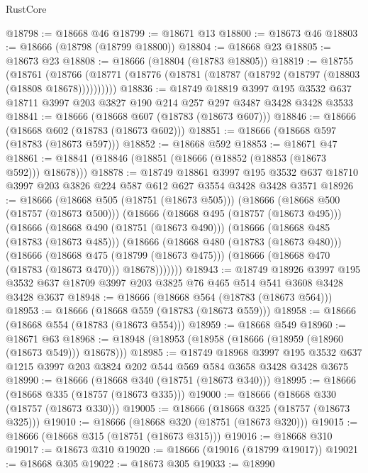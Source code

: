 \begin{lexlean}{RustCore}
\begin{coremodule}
@18798 := @18668 @46
@18799 := @18671 @13
@18800 := @18673 @46
@18803 := @18666 (@18798 (@18799 @18800))
@18804 := @18668 @23
@18805 := @18673 @23
@18808 := @18666 (@18804 (@18783 @18805))
@18819 := @18755
    (@18761 (@18766 (@18771 (@18776 (@18781 (@18787 (@18792 (@18797 (@18803 (@18808 @18678))))))))))
@18836 := @18749
    @18819
    @3997
    @195
    @3532
    @637
    @18711
    @3997
    @203
    @3827
    @190
    @214
    @257
    @297
    @3487
    @3428
    @3428
    @3533
@18841 := @18666 (@18668 @607 (@18783 (@18673 @607)))
@18846 := @18666 (@18668 @602 (@18783 (@18673 @602)))
@18851 := @18666 (@18668 @597 (@18783 (@18673 @597)))
@18852 := @18668 @592
@18853 := @18671 @47
@18861 := @18841 (@18846 (@18851 (@18666 (@18852 (@18853 (@18673 @592))) @18678)))
@18878 := @18749
    @18861
    @3997
    @195
    @3532
    @637
    @18710
    @3997
    @203
    @3826
    @224
    @587
    @612
    @627
    @3554
    @3428
    @3428
    @3571
@18926 := @18666
    (@18668 @505 (@18751 (@18673 @505)))
    (@18666
      (@18668 @500 (@18757 (@18673 @500)))
      (@18666
        (@18668 @495 (@18757 (@18673 @495)))
        (@18666
          (@18668 @490 (@18751 (@18673 @490)))
          (@18666
            (@18668 @485 (@18783 (@18673 @485)))
            (@18666
              (@18668 @480 (@18783 (@18673 @480)))
              (@18666
                (@18668 @475 (@18799 (@18673 @475)))
                (@18666 (@18668 @470 (@18783 (@18673 @470))) @18678)))))))
@18943 := @18749
    @18926
    @3997
    @195
    @3532
    @637
    @18709
    @3997
    @203
    @3825
    @76
    @465
    @514
    @541
    @3608
    @3428
    @3428
    @3637
@18948 := @18666 (@18668 @564 (@18783 (@18673 @564)))
@18953 := @18666 (@18668 @559 (@18783 (@18673 @559)))
@18958 := @18666 (@18668 @554 (@18783 (@18673 @554)))
@18959 := @18668 @549
@18960 := @18671 @63
@18968 := @18948 (@18953 (@18958 (@18666 (@18959 (@18960 (@18673 @549))) @18678)))
@18985 := @18749
    @18968
    @3997
    @195
    @3532
    @637
    @1215
    @3997
    @203
    @3824
    @202
    @544
    @569
    @584
    @3658
    @3428
    @3428
    @3675
@18990 := @18666 (@18668 @340 (@18751 (@18673 @340)))
@18995 := @18666 (@18668 @335 (@18757 (@18673 @335)))
@19000 := @18666 (@18668 @330 (@18757 (@18673 @330)))
@19005 := @18666 (@18668 @325 (@18757 (@18673 @325)))
@19010 := @18666 (@18668 @320 (@18751 (@18673 @320)))
@19015 := @18666 (@18668 @315 (@18751 (@18673 @315)))
@19016 := @18668 @310
@19017 := @18673 @310
@19020 := @18666 (@19016 (@18799 @19017))
@19021 := @18668 @305
@19022 := @18673 @305
@19033 := @18990

\end{coremodule}
\end{lexlean}
